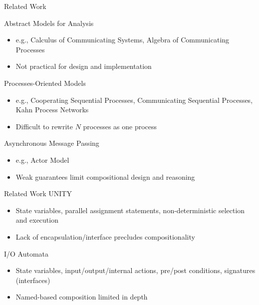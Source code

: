 \documentclass{beamer}
\begin{document}




\begin{frame}{Related Work}

  Abstract Models for Analysis
  \begin{itemize}
  \item e.g., Calculus of Communicating Systems, Algebra of Communicating Processes
  \item Not practical for design and implementation
  \end{itemize}

  Processes-Oriented Models
  \begin{itemize}
  \item e.g., Cooperating Sequential Processes, Communicating Sequential Processes, Kahn Process Networks
  \item Difficult to rewrite $N$ processes as one process
  \end{itemize}

  Asynchronous Message Passing
  \begin{itemize}
  \item e.g., Actor Model
  \item Weak guarantees limit compositional design and reasoning
  \end{itemize}
\end{frame}

\begin{frame}{Related Work}
  UNITY
  \begin{itemize}
  \item State variables, parallel assignment statements, non-deterministic selection and execution
  \item Lack of encapsulation/interface precludes compositionality
  \end{itemize}

  I/O Automata
  \begin{itemize}
  \item State variables, input/output/internal actions, pre/post conditions, signatures (interfaces)
  \item Named-based composition limited in depth
  \end{itemize}

\end{frame}
\end{document}
